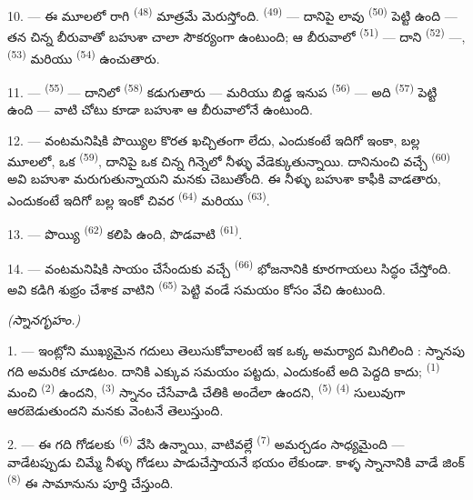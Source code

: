 10. --- ఈ మూలలో రాగి  \textsuperscript{(48)} మాత్రమే మెరుస్తోంది.
 \textsuperscript{(49)} — దానిపై లావు  \textsuperscript{(50)}
పెట్టి ఉంది — తన చిన్న బీరువాతో బహుశా చాలా సౌకర్యంగా ఉంటుంది; ఆ బీరువాలో 
\textsuperscript{(51)} — దాని  \textsuperscript{(52)} —,
 \textsuperscript{(53)} మరియు 
\textsuperscript{(54)} ఉంచుతారు.

\VUsaut{4.0mm}
\VUsaut{3.0mm}

11. ---  \textsuperscript{(55)} — దానిలో 
\textsuperscript{(58)} కడుగుతారు — మరియు బిడ్డ ఇనుప  \textsuperscript{(56)} —
అది  \textsuperscript{(57)} పెట్టి ఉంది — వాటి చోటు కూడా బహుశా ఆ బీరువాలోనే
ఉంటుంది.

12. --- వంటమనిషికి పొయ్యిల కొరత ఖచ్చితంగా లేదు, ఎందుకంటే ఇదిగో ఇంకా, బల్ల మూలలో, ఒక
 \textsuperscript{(59)}, దానిపై ఒక చిన్న గిన్నెలో నీళ్ళు
వేడెక్కుతున్నాయి. దానినుంచి వచ్చే  \textsuperscript{(60)} అవి బహుశా
మరుగుతున్నాయని మనకు చెబుతోంది. ఈ నీళ్ళు బహుశా కాఫీకి వాడతారు, ఎందుకంటే ఇదిగో బల్ల ఇంకో చివర
 \textsuperscript{(64)} మరియు  \textsuperscript{(63)}.

13. --- పొయ్యి  \textsuperscript{(62)} కలిపి ఉంది, పొడవాటి
 \textsuperscript{(61)}.

14. --- వంటమనిషికి సాయం చేసేందుకు వచ్చే  \textsuperscript{(66)}
భోజనానికి కూరగాయలు సిద్ధం చేస్తోంది. అవి కడిగి శుభ్రం చేశాక వాటిని 
\textsuperscript{(65)} పెట్టి వండే సమయం కోసం వేచి ఉంటుంది.

\VUsaut{4.0mm}
{\centering\fontsize{10.2pt}{10.2pt}\selectfont{}
\textit{(స్నానగృహం.)}\par}
\VUsaut{3.0mm}

1. --- ఇంట్లోని ముఖ్యమైన గదులు తెలుసుకోవాలంటే ఇక ఒక్క అమర్యాద మిగిలింది : స్నానపు గది అమరిక
చూడటం. దానికి ఎక్కువ సమయం పట్టదు, ఎందుకంటే అది పెద్దది కాదు; 
\textsuperscript{(1)} మంచి  \textsuperscript{(2)} ఉందని,
 \textsuperscript{(3)} స్నానం చేసేవాడి చేతికి అందేలా ఉందని,
 \textsuperscript{(5)}  \textsuperscript{(4)}
సులువుగా ఆరబెడుతుందని మనకు వెంటనే తెలుస్తుంది.

2. --- ఈ గది గోడలకు  \textsuperscript{(6)} వేసి ఉన్నాయి, వాటివల్లే
 \textsuperscript{(7)} అమర్చడం సాధ్యమైంది — వాడేటప్పుడు చిమ్మే నీళ్ళు
గోడలు పాడుచేస్తాయనే భయం లేకుండా. కాళ్ళ స్నానానికి వాడే జింక్ 
\textsuperscript{(8)} ఈ సామానును పూర్తి చేస్తుంది.

\VUsaut{6.0mm}
\VUfilet{22mm}
